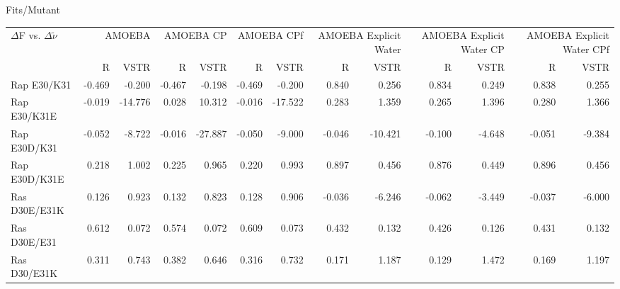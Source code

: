 \documentclass[landscape]{article}
\begin{document}
	
	
	
Fits/Mutant \\
{
\begin{tabular}{ l || r r | r r | r r | r r| r r | r r}
$\Delta$F vs. $\Delta \tilde \nu$ & \multicolumn{2}{|C{2cm}}{AMOEBA} & \multicolumn{2}{|C{2cm}}{AMOEBA CP} & \multicolumn{2}{|C{2cm}}{AMOEBA CPf} & \multicolumn{2}{|C{2cm}}{AMOEBA Explicit Water} & \multicolumn{2}{|C{2cm}}{AMOEBA Explicit Water CP} & \multicolumn{2}{|C{2cm}}{AMOEBA Explicit Water CPf} \\
 & \multicolumn{1}{|C{1cm}}{R} & \multicolumn{1}{C{1cm}}{VSTR} & \multicolumn{1}{|C{1cm}}{R} & \multicolumn{1}{C{1cm}}{VSTR} & \multicolumn{1}{|C{1cm}}{R} & \multicolumn{1}{C{1cm}}{VSTR}  & \multicolumn{1}{|C{1cm}}{R} & \multicolumn{1}{C{1cm}}{VSTR} & \multicolumn{1}{|C{1cm}}{R} & \multicolumn{1}{C{1cm}}{VSTR} & \multicolumn{1}{|C{1cm}}{R} & \multicolumn{1}{C{1cm}}{VSTR} \\
\hline\hline	
Rap E30/K31    & -0.469         & -0.200         & -0.467         & -0.198         & -0.469         & -0.200         & 0.840          & 0.256          & 0.834          & 0.249          & 0.838          & 0.255         \\
Rap E30/K31E   & -0.019         & -14.776        & 0.028          & 10.312         & -0.016         & -17.522        & 0.283          & 1.359          & 0.265          & 1.396          & 0.280          & 1.366         \\
Rap E30D/K31   & -0.052         & -8.722         & -0.016         & -27.887        & -0.050         & -9.000         & -0.046         & -10.421        & -0.100         & -4.648         & -0.051         & -9.384        \\
Rap E30D/K31E  & 0.218          & 1.002          & 0.225          & 0.965          & 0.220          & 0.993          & 0.897          & 0.456          & 0.876          & 0.449          & 0.896          & 0.456         \\
Ras D30E/E31K  & 0.126          & 0.923          & 0.132          & 0.823          & 0.128          & 0.906          & -0.036         & -6.246         & -0.062         & -3.449         & -0.037         & -6.000        \\
Ras D30E/E31   & 0.612          & 0.072          & 0.574          & 0.072          & 0.609          & 0.073          & 0.432          & 0.132          & 0.426          & 0.126          & 0.431          & 0.132         \\
Ras D30/E31K   & 0.311          & 0.743          & 0.382          & 0.646          & 0.316          & 0.732          & 0.171          & 1.187          & 0.129          & 1.472          & 0.169          & 1.197         \\

\end{tabular}}
\end{document}
